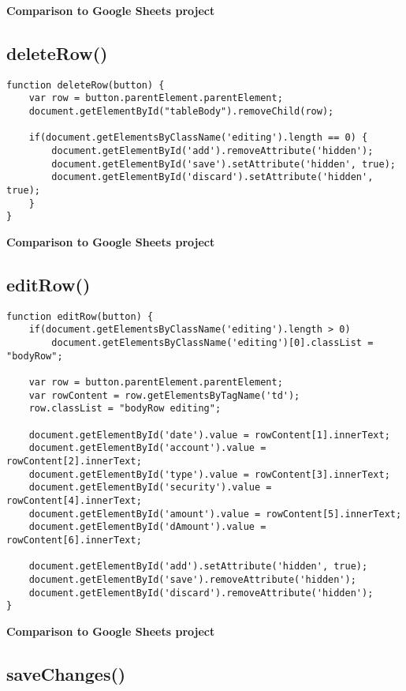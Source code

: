 \documentclass[letterpaper]{article}
\begin{document}
\textbf{Comparison to Google Sheets project}

\subsection{deleteRow()}

\begin{lstlisting}[firstnumber=166]
function deleteRow(button) {
    var row = button.parentElement.parentElement;
    document.getElementById("tableBody").removeChild(row);

    if(document.getElementsByClassName('editing').length == 0) {
        document.getElementById('add').removeAttribute('hidden');
        document.getElementById('save').setAttribute('hidden', true);
        document.getElementById('discard').setAttribute('hidden', true);
    }
}
\end{lstlisting}

\textbf{Comparison to Google Sheets project}

\subsection{editRow()}

\begin{lstlisting}[firstnumber=177]
function editRow(button) {
    if(document.getElementsByClassName('editing').length > 0)
        document.getElementsByClassName('editing')[0].classList = "bodyRow";

    var row = button.parentElement.parentElement;
    var rowContent = row.getElementsByTagName('td');
    row.classList = "bodyRow editing";

    document.getElementById('date').value = rowContent[1].innerText;
    document.getElementById('account').value = rowContent[2].innerText;
    document.getElementById('type').value = rowContent[3].innerText;
    document.getElementById('security').value = rowContent[4].innerText;
    document.getElementById('amount').value = rowContent[5].innerText;
    document.getElementById('dAmount').value = rowContent[6].innerText;

    document.getElementById('add').setAttribute('hidden', true);
    document.getElementById('save').removeAttribute('hidden');
    document.getElementById('discard').removeAttribute('hidden');
}
\end{lstlisting}

\textbf{Comparison to Google Sheets project}

\subsection{saveChanges()}
\end{document}
